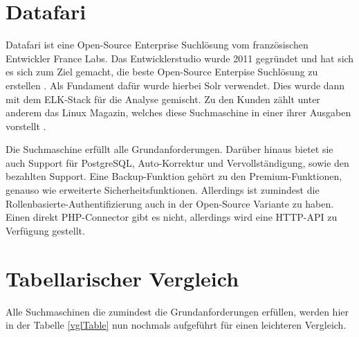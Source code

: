 \section{Datafari}
\label{datafari}

Datafari ist eine Open-Source Enterprise Suchlösung vom französischen Entwickler France Labs. Das Entwicklerstudio wurde 2011 gegründet und hat sich es sich zum Ziel gemacht, die beste Open-Source Enterpise Suchlösung zu erstellen \cite{Labs.2019}. Als Fundament dafür wurde hierbei Solr verwendet. Dies wurde dann mit dem ELK-Stack für die Analyse gemischt. Zu den Kunden zählt unter anderem das Linux Magazin, welches diese Suchmaschine in einer ihrer Ausgaben vorstellt \cite{MichaelBrandenburg.2019}. 

Die Suchmaschine erfüllt alle Grundanforderungen. Darüber hinaus bietet sie auch Support für PostgreSQL, Auto-Korrektur und Vervollständigung, sowie den bezahlten Support. Eine Backup-Funktion gehört zu den Premium-Funktionen, genauso wie erweiterte Sicherheitsfunktionen. Allerdings ist zumindest die Rollenbasierte-Authentifizierung auch in der Open-Source Variante zu haben. Einen direkt PHP-Connector gibt es nicht, allerdings wird eine HTTP-API zu Verfügung gestellt. \cite{Labs.b}

\section{Tabellarischer Vergleich}

Alle Suchmaschinen die zumindest die Grundanforderungen erfüllen, werden hier in der Tabelle \ref{vglTable} nun nochmals aufgeführt für einen leichteren Vergleich.

